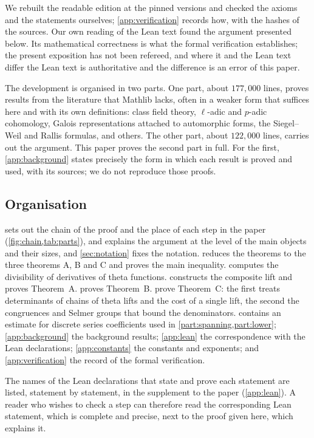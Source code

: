We rebuilt the readable edition at the pinned versions and checked the axioms and the statements
ourselves; \cref{app:verification} records how, with the hashes of the sources. Our own reading of the
Lean text found the argument presented below. Its mathematical correctness is what the formal
verification establishes; the present exposition has not been refereed, and where it and the Lean text
differ the Lean text is authoritative and the difference is an error of this paper.

The development is organised in two parts. One part, about $177{,}000$ lines, proves results from the
literature that Mathlib lacks, often in a weaker form that suffices here and with its own definitions:
class field theory, $\ell$-adic and $p$-adic cohomology, Galois representations attached to automorphic
forms, the Siegel--Weil and Rallis formulas, and others. The other part, about $122{,}000$ lines, carries
out the argument. This paper proves the second part in full. For the first, \cref{app:background} states
precisely the form in which each result is proved and used, with its sources; we do not reproduce
those proofs.

\subsection{Organisation}\label{ss:intro-organisation}
 sets out the chain of the proof and the place of each step in the paper
(\cref{fig:chain,tab:parts}), and explains the argument at the level of the main objects and their sizes, and
\cref{sec:notation} fixes the notation.  reduces the theorems to the three theorems
A, B and C and proves the main inequality.  computes the divisibility of
derivatives of theta functions.  constructs the composite lift and proves Theorem~A.
 proves Theorem~B.  prove Theorem~C: the first
treats determinants of chains of theta lifts and the cost of a single lift, the second the congruences
and Selmer groups that bound the denominators.  contains an estimate for discrete series
coefficients used in \cref{part:spanning,part:lower}; \cref{app:background} the background results;
\cref{app:lean} the correspondence with the Lean declarations; \cref{app:constants} the constants and
exponents; and \cref{app:verification} the record of the formal verification.

The names of the Lean declarations that state and prove each statement are listed, statement by
statement, in the supplement to the paper (\cref{app:lean}). A reader who wishes to check a step can
therefore read the corresponding Lean statement, which is complete and precise, next to the proof
given here, which explains it.

